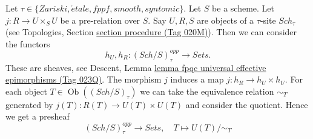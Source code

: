 \documentclass{amsart}
\theoremstyle{plain}
\theoremstyle{definition}
\theoremstyle{remark}
\numberwithin{equation}{subsection}
\def\Sch{\mathit{Sch}}
\def\Ob{\mathop{\mathrm{Ob}}\nolimits}
\def\etale{{\acute{e}tale}}
\begin{document}
Let $\tau \in \{Zariski, \etale, fppf, smooth, syntomic\}$.
Let $S$ be a scheme.
Let $j : R \to U \times_S U$ be a pre-relation over $S$.
Say $U, R, S$ are objects of a $\tau$-site $\Sch_\tau$
(see Topologies, Section \href{https://stacks.math.columbia.edu/tag/020M}{section procedure (Tag 020M)}).
Then we can consider the functors
$$
h_U, h_R :
(\Sch/S)_\tau^{opp}
\longrightarrow
\textit{Sets}.
$$
These are sheaves, see
Descent, Lemma \href{https://stacks.math.columbia.edu/tag/023Q}{lemma fpqc universal effective epimorphisms (Tag 023Q)}.
The morphism $j$ induces a map $j : h_R \to h_U \times h_U$.
For each object $T \in \Ob((\Sch/S)_\tau)$
we can take the equivalence relation $\sim_T$ generated by
$j(T) : R(T) \to U(T) \times U(T)$ and consider the quotient.
Hence we get a presheaf
\begin{equation}
\label{groupoids-equation-quotient-presheaf}
(\Sch/S)_\tau^{opp}
\longrightarrow
\textit{Sets}, \quad
T \longmapsto U(T)/\sim_T
\end{equation}
\end{document}
